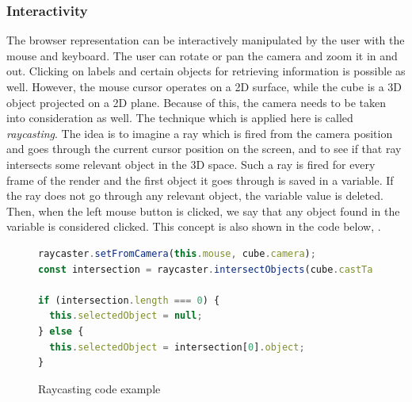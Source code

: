 \subsubsection{Interactivity}
The browser representation can be interactively manipulated by the user with the mouse and keyboard. The user can rotate or pan the camera and
zoom it in and out. Clicking on labels and certain objects for retrieving information is possible as well. However, the mouse cursor operates on a
2D surface, while the cube is a 3D object projected on a 2D plane. Because of this, the camera needs to be taken into
consideration as well. The technique which is applied here is called \emph{raycasting}. The idea is to imagine a ray which is fired from the camera
position and goes through the current cursor position on the screen, and to see if that ray intersects some relevant object in the 3D space. Such a
ray is fired for every frame of the render and the first object it goes through is saved in a variable. If the ray does not go through any relevant
object, the variable value is deleted. Then, when the left mouse button is clicked, we say that any object found in the variable is considered
clicked. This concept is also shown in the code below, .

\begin{figure}[hbt!]
    \begin{center}
        \begin{lstlisting}[language=JavaScript,label={lst:impl-stc-code-1},belowskip=-1 \baselineskip]
raycaster.setFromCamera(this.mouse, cube.camera);
const intersection = raycaster.intersectObjects(cube.castTargets);

if (intersection.length === 0) {
  this.selectedObject = null;
} else {
  this.selectedObject = intersection[0].object;
}
        \end{lstlisting}
    \end{center}
    \caption{Raycasting code example}
    \label{fig:3.14}
\end{figure}


\clearpage